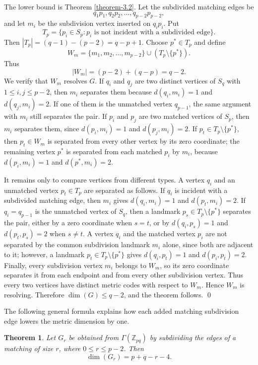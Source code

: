 \documentclass[12pt]{article}
\renewenvironment{proof}{{\bf \noindent Proof.}}{\qed}
\newtheorem{theorem}{Theorem}[section]
\begin{document}
\begin{proof}
The lower bound is Theorem \ref{theorem-3.2}. Let the subdivided matching edges be
$$
q_1p_1,q_2p_2,\ldots,q_{p-2}p_{p-2},
$$
and let $m_i$ be the subdivision vertex inserted on $q_ip_i$. Put
$$
T_p=\{p_i\in S_p:p_i\text{ is not incident with a subdivided edge}\}.
$$
Then $|T_p|=(q-1)-(p-2)=q-p+1$. Choose $p^*\in T_p$ and define
$$
W_m=\{m_1,m_2,\ldots,m_{p-2}\}\cup (T_p\setminus\{p^*\}).
$$
Thus
$$
|W_m|=(p-2)+(q-p)=q-2.
$$
We verify that $W_m$ resolves $G$. If $q_i$ and $q_j$ are two distinct vertices of $S_q$ with $1\leq i,j\leq p-2$, then $m_i$ separates them because $d(q_i,m_i)=1$ and $d(q_j,m_i)=2$. If one of them is the unmatched vertex $q_{p-1}$, the same argument with $m_i$ still separates the pair. If $p_i$ and $p_j$ are two matched vertices of $S_p$, then $m_i$ separates them, since $d(p_i,m_i)=1$ and $d(p_j,m_i)=2$. If $p_t\in T_p\setminus\{p^*\}$, then $p_t\in W_m$ is separated from every other vertex by its zero coordinate; the remaining vertex $p^*$ is separated from each matched $p_i$ by $m_i$, because $d(p_i,m_i)=1$ and $d(p^*,m_i)=2$.

It remains only to compare vertices from different types. A vertex $q_i$ and an unmatched vertex $p_t\in T_p$ are separated as follows. If $q_i$ is incident with a subdivided matching edge, then $m_i$ gives $d(q_i,m_i)=1$ and $d(p_t,m_i)=2$. If $q_i=q_{p-1}$ is the unmatched vertex of $S_q$, then a landmark $p_s\in T_p\setminus\{p^*\}$ separates the pair, either by a zero coordinate when $s=t$, or by $d(q_i,p_s)=1$ and $d(p_t,p_s)=2$ when $s\neq t$. A vertex $q_i$ and the matched vertex $p_i$ are not separated by the common subdivision landmark $m_i$ alone, since both are adjacent to it; however, a landmark $p_t\in T_p\setminus\{p^*\}$ gives $d(q_i,p_t)=1$ and $d(p_i,p_t)=2$. Finally, every subdivision vertex $m_i$ belongs to $W_m$, so its zero coordinate separates it from each endpoint and from every other subdivision vertex. Thus every two vertices have distinct metric codes with respect to $W_m$. Hence $W_m$ is resolving. Therefore $\dim(G)\leq q-2$, and the theorem follows.
\end{proof}

\medskip
\noindent The following general formula explains how each added matching subdivision edge lowers the metric dimension by one.
\begin{theorem}\label{thm-general-matching}
Let $G_r$ be obtained from $\Gamma(\mathbb Z_{pq})$ by subdividing the edges of a matching of size $r$, where $0\leq r\leq p-2$. Then
$$
\dim(G_r)=p+q-r-4.
$$
\end{theorem}
\end{document}
